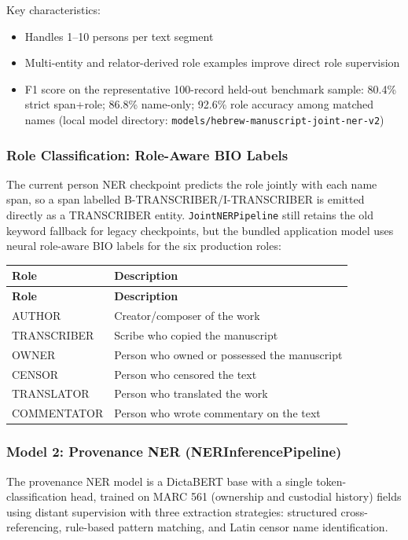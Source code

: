 \documentclass[12pt]{article}
\newcommand{\code}[1]{\texttt{#1}}
\begin{document}
Key characteristics:
\begin{itemize}
\item Handles 1--10 persons per text segment
\item Multi-entity and relator-derived role examples improve direct role supervision
\item F1 score on the representative 100-record held-out benchmark sample: 80.4\% strict span+role; 86.8\% name-only; 92.6\% role accuracy among matched names (local model directory: \code{models/hebrew-manuscript-joint-ner-v2})
\end{itemize}

\subsubsection{Role Classification: Role-Aware BIO Labels}

The current person NER checkpoint predicts the role jointly with each name span, so a span labelled B-TRANSCRIBER/I-TRANSCRIBER is emitted directly as a TRANSCRIBER entity. \code{JointNERPipeline} still retains the old keyword fallback for legacy checkpoints, but the bundled application model uses neural role-aware BIO labels for the six production roles:

\begin{longtable}{|l|p{8cm}|}
\hline
\textbf{Role} & \textbf{Description} \\
\hline
\endfirsthead
\hline
\textbf{Role} & \textbf{Description} \\
\hline
\endhead
\hline
\endfoot
AUTHOR & Creator/composer of the work \\
\hline
TRANSCRIBER & Scribe who copied the manuscript \\
\hline
OWNER & Person who owned or possessed the manuscript \\
\hline
CENSOR & Person who censored the text \\
\hline
TRANSLATOR & Person who translated the work \\
\hline
COMMENTATOR & Person who wrote commentary on the text \\
\hline
\end{longtable}

\subsubsection{Model 2: Provenance NER (NERInferencePipeline)}

The provenance NER model is a DictaBERT base with a single token-classification head, trained on MARC 561 (ownership and custodial history) fields using distant supervision with three extraction strategies: structured cross-referencing, rule-based pattern matching, and Latin censor name identification.
\end{document}
